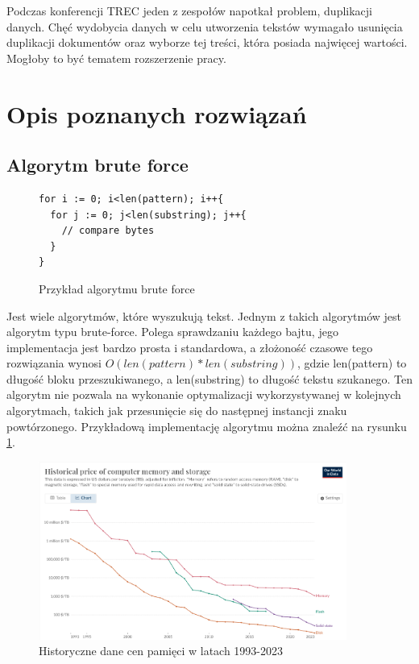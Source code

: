 
Podczas konferencji TREC \cite{bib:konferencja:TRECDuplicates} jeden z zespołów 
napotkał problem, duplikacji danych. Chęć wydobycia danych w celu utworzenia
tekstów wymagało usunięcia duplikacji dokumentów oraz wyborze tej treści,
która posiada najwięcej wartości. Mogłoby to być tematem rozszerzenie pracy. 

\section{Opis poznanych rozwiązań}
\subsection{Algorytm brute force}

\begin{figure}[h]
  \centering
  \begin{lstlisting}
for i := 0; i<len(pattern); i++{
  for j := 0; j<len(substring); j++{
    // compare bytes
  }
}
  \end{lstlisting}
  \caption{Przykład algorytmu brute force}
  \label{fig:code:bruteForceComparison}
\end{figure}

Jest wiele algorytmów, które wyszukują tekst. Jednym z takich algorytmów jest 
algorytm typu brute-force. Polega sprawdzaniu każdego bajtu, jego implementacja
jest bardzo prosta i standardowa, a złożoność czasowe tego rozwiązania wynosi
$O(len(pattern) * len(substring))$, gdzie len(pattern) to długość bloku 
przeszukiwanego, a len(substring) to długość tekstu szukanego. Ten algorytm nie 
pozwala na wykonanie optymalizacji wykorzystywanej w kolejnych algorytmach, 
takich jak przesunięcie się do następnej instancji znaku powtórzonego. 
Przykładową implementację algorytmu można znaleźć na rysunku
\ref{fig:code:bruteForceComparison}.


\begin{figure}[h]
  \centering
  \includegraphics[width=0.9\textwidth]{./images/historical-mem-price.png}
  \caption{Historyczne dane cen pamięci w latach 1993-2023}
  \label{screenshot:MemPrices}
\end{figure}

